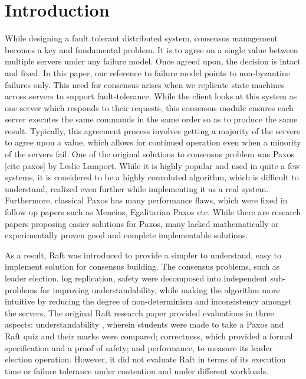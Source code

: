 \section{Introduction}
 
While designing a fault tolerant distributed system, consensus management becomes a key and fundamental problem. It is to agree on a single value between multiple servers under any failure model. Once agreed upon, the decision is intact and fixed. In this paper, our reference to failure model points to non-byzantine failures only. This need for consensus arises when we replicate state machines across servers to support fault-tolerance. While the client looks at this system as one server which responds to their requests, this consensus module ensures each server executes the same commands in the same order so as to produce the same result. Typically, this agreement process involves getting a majority of the servers to agree upon a value, which allows for continued operation even when a minority of the servers fail. One of the original solutions to consensus problem was Paxos [cite paxos] by Leslie Lamport. While it is highly popular and used in quite a few systems, it is considered to be a highly convoluted algorithm, which is difficult to understand, realized even further while implementing it as a real system. Furthermore, classical Paxos has many performance flaws, which were fixed in follow up papers such as Mencius\cite{mencius}, Egalitarian Paxos\cite{epaxos} etc. While there are research papers proposing easier solutions for Paxos, many lacked mathematically or experimentally proven good and complete implementable solutions. 

As a result, Raft was introduced to provide a simpler to understand, easy to implement solution for consensus building. The consensus problems, such as leader election, log replication, safety were decomposed into independent sub-problems for improving understandability, while making the algorithm more intuitive by reducing the degree of non-determinism and inconsistency amongst the servers. 
The original Raft research paper provided evaluations in three aspects: understandability , wherein students were made to take a Paxos and Raft quiz and their marks were compared; correctness, which provided a formal specification and a proof of safety; and performance, to measure its leader election operation. However, it did not evaluate Raft in terms of its execution time or failure tolerance under contention and under different workloads. 

